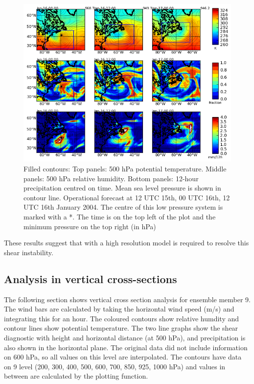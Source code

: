 \begin{figure}	%
	\includegraphics[width=36pc,angle=0]{plot_var_poly_fc_ptRHprecip_12UTC_15.png}
	\caption{Filled contours: Top panels: 500 hPa potential temperature. Middle panels: 500 hPa relative humidity. Bottom panels: 12-hour precipitation centred on time. Mean sea level pressure is shown in contour line. Operational forecast at 12 UTC 15th, 00 UTC 16th, 12 UTC 16th January 2004. The centre of this low pressure system is marked with a *. The time is on the top left of the plot and the minimum pressure on the top right (in hPa)}\label{fig:fc_pt_RH_precip}
	\centering
\end{figure}


These results suggest that with a high resolution model is required to resolve this shear instability. 



\subsection{Analysis in vertical cross-sections} \label{cx_analysis}

The following section shows vertical cross section analysis for ensemble member 9. The wind bars are calculated by taking the horizontal wind speed (m/s) and integrating this for an hour. The coloured contours show relative humdity and contour lines show potential temperature. The two line graphs show the shear diagnostic with height and horizontal distance (at 500 hPa), and precipitation is also shown in the horizontal plane. The original data did not include information on 600 hPa, so all values on this level are interpolated. The contours have data on 9 level (200, 300, 400, 500, 600, 700, 850, 925, 1000 hPa) and values in between are calculated by the plotting function.


